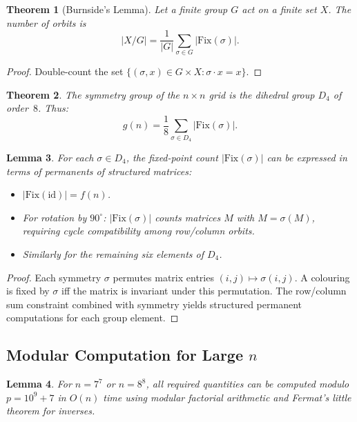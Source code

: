\documentclass[11pt]{article}
\newtheorem{theorem}{Theorem}
\newtheorem{lemma}[theorem]{Lemma}
\theoremstyle{definition}
\begin{document}
\begin{theorem}[Burnside's Lemma]
Let a finite group $G$ act on a finite set $X$. The number of orbits is
\[
|X/G| = \frac{1}{|G|}\sum_{\sigma \in G}|\mathrm{Fix}(\sigma)|.
\]
\end{theorem}

\begin{proof}
Double-count the set $\{(\sigma,x) \in G \times X : \sigma \cdot x = x\}$.
\end{proof}

\begin{theorem}
The symmetry group of the $n \times n$ grid is the dihedral group $D_4$ of order~$8$. Thus:
\[
g(n) = \frac{1}{8}\sum_{\sigma \in D_4}|\mathrm{Fix}(\sigma)|.
\]
\end{theorem}

\begin{lemma}
For each $\sigma \in D_4$, the fixed-point count $|\mathrm{Fix}(\sigma)|$ can be expressed in terms of permanents of structured matrices:
\begin{itemize}
\item $|\mathrm{Fix}(\mathrm{id})| = f(n)$.
\item For rotation by $90^\circ$: $|\mathrm{Fix}(\sigma)|$ counts matrices $M$ with $M = \sigma(M)$, requiring cycle compatibility among row/column orbits.
\item Similarly for the remaining six elements of $D_4$.
\end{itemize}
\end{lemma}

\begin{proof}
Each symmetry $\sigma$ permutes matrix entries $(i,j) \mapsto \sigma(i,j)$. A colouring is fixed by $\sigma$ iff the matrix is invariant under this permutation. The row/column sum constraint combined with symmetry yields structured permanent computations for each group element.
\end{proof}

\subsection{Modular Computation for Large $n$}

\begin{lemma}
For $n = 7^7$ or $n = 8^8$, all required quantities can be computed modulo $p = 10^9+7$ in $O(n)$ time using modular factorial arithmetic and Fermat's little theorem for inverses.
\end{lemma}
\end{document}
